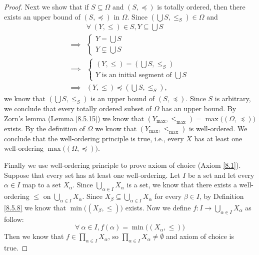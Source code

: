\begin{proof}
    Next we show that if \(S \subseteq \Omega\) and \((S, \preceq)\) is totally ordered, then there exists an upper bound of \((S, \preceq)\) in \(\Omega\).
    Since \((\bigcup S, \leq_S) \in \Omega\) and
    \begin{align*}
                 & \forall\ (Y, \leq) \in S, Y \subseteq \bigcup S \\
        \implies & \begin{cases}
            Y = \bigcup S \\
            Y \subsetneq \bigcup S
        \end{cases}                      \\
        \implies & \begin{cases}
            (Y, \leq) = (\bigcup S, \leq_S) \\
            Y \text{ is an initial segment of } \bigcup S
        \end{cases}                      \\
        \implies & (Y, \leq) \preceq (\bigcup S, \leq_S),
    \end{align*}
    we know that \((\bigcup S, \leq_S)\) is an upper bound of \((S, \preceq)\).
    Since \(S\) is arbitrary, we conclude that every totally ordered subset of \(\Omega\) has an upper bound.
    By Zorn's lemma (Lemma \ref{8.5.15}) we know that \((Y_{\max}, \leq_{\max}) = \max\big((\Omega, \preceq)\big)\) exists.
    By the definition of \(\Omega\) we know that \((Y_{\max}, \leq_{\max})\) is well-ordered.
    We conclude that the well-ordering principle is true, i.e., every \(X\) has at least one well-ordering \(\max\big((\Omega, \preceq)\big)\).

    Finally we use well-ordering principle to prove axiom of choice (Axiom \ref{8.1}).
    Suppose that every set has at least one well-ordering.
    Let \(I\) be a set and let every \(\alpha \in I\) map to a set \(X_{\alpha}\).
    Since \(\bigcup_{\alpha \in I} X_{\alpha}\) is a set, we know that there exists a well-ordering \(\leq\) on \(\bigcup_{\alpha \in I} X_{\alpha}\).
    Since \(X_{\beta} \subseteq \bigcup_{\alpha \in I} X_{\alpha}\) for every \(\beta \in I\), by Definition \ref{8.5.8} we know that \(\min\big((X_{\beta}, \leq)\big)\) exists.
    Now we define \(f : I \to \bigcup_{\alpha \in I} X_{\alpha}\) as follow:
    \[
        \forall\ \alpha \in I, f(\alpha) = \min\big((X_{\alpha}, \leq)\big)
    \]
    Then we know that \(f \in \prod_{\alpha \in I} X_{\alpha}\), so \(\prod_{\alpha \in I} X_{\alpha} \neq \emptyset\) and axiom of choice is true.
\end{proof}

